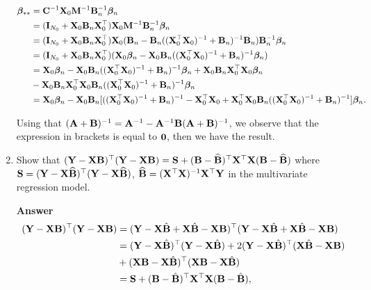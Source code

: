 \begin{enumerate}[leftmargin=*]
\begin{align*}
	\bm{\beta}_{**}&={\bf{C}}^{-1}{\bf{X}}_0{\bf{M}}^{-1}{\bf{B}}_n^{-1}\bm{\beta}_n\\
	&=({\bf{I}}_{N_0}+{\bf{X}}_0{\bf{B}}_n{\bf{X}}_0^{\top}){\bf{X}}_0{\bf{M}}^{-1}{\bf{B}}_n^{-1}\bm{\beta}_n\\
	&=({\bf{I}}_{N_0}+{\bf{X}}_0{\bf{B}}_n{\bf{X}}_0^{\top}){\bf{X}}_0({\bf{B}}_n-{\bf{B}}_n(({\bf{X}}_0^{\top}{\bf{X}}_0)^{-1}+{\bf{B}}_n)^{-1}{\bf{B}}_n){\bf{B}}_n^{-1}\bm{\beta}_n\\
	&=({\bf{I}}_{N_0}+{\bf{X}}_0{\bf{B}}_n{\bf{X}}_0^{\top})({\bf{X}}_0\bm{\beta}_n-{\bf{X}}_0{\bf{B}}_n(({\bf{X}}_0^{\top}{\bf{X}}_0)^{-1}+{\bf{B}}_n)^{-1}\bm{\beta}_n)\\
	&={\bf{X}}_0\bm{\beta}_n-{\bf{X}}_0{\bf{B}}_n(({\bf{X}}_0^{\top}{\bf{X}}_0)^{-1}+{\bf{B}}_n)^{-1}\bm{\beta}_n+{\bf{X}}_0{\bf{B}}_n{\bf{X}}_0^{\top}{\bf{X}}_0\bm{\beta}_n\\
	&-{\bf{X}}_0{\bf{B}}_n{\bf{X}}_0^{\top}{\bf{X}}_0{\bf{B}}_n(({\bf{X}}_0^{\top}{\bf{X}}_0)^{-1}+{\bf{B}}_n)^{-1}\bm{\beta}_n\\
	&={\bf{X}}_0\bm{\beta}_n-{\bf{X}}_0{\bf{B}}_n[(({\bf{X}}_0^{\top}{\bf{X}}_0)^{-1}+{\bf{B}}_n)^{-1}-{\bf{X}}_0^{\top}{\bf{X}}_0+{\bf{X}}_0^{\top}{\bf{X}}_0{\bf{B}}_n(({\bf{X}}_0^{\top}{\bf{X}}_0)^{-1}+{\bf{B}}_n)^{-1}]\bm{\beta}_n.
\end{align*}

Using that $({\bf{A}}+{\bf{B}})^{-1}={\bf{A}}^{-1}-{\bf{A}}^{-1}{\bf{B}}({\bf{A}}+{\bf{B}})^{-1}$, we observe that the expression in brackets is equal to ${\bf{0}}$, then we have the result.

\item Show that $({\bf{Y}}-{\bf{X}}{\bf{B}})^{\top}({\bf{Y}}-{\bf{X}}{\bf{B}})={\bf{S}}+({\bf{B}}-\widehat{\bf{B}})^{\top}{\bf{X}}^{\top}{\bf{X}}({\bf{B}}-\widehat{\bf{B}})$ where ${\bf{S}}= ({\bf{Y}}-{\bf{X}}\widehat{\bf{B}})^{\top}({\bf{Y}}-{\bf{X}}\widehat{\bf{B}})$, $\widehat{\bf{B}}= ({\bf{X}}^{\top}{\bf{X}})^{-1}{\bf{X}}^{\top}{\bf{Y}}$ in the multivariate regression model.

\textbf{Answer}
\begin{align*}
	({\bf{Y}}-{\bf{X}}{\bf{B}})^{\top}({\bf{Y}}-{\bf{X}}{\bf{B}})&=({\bf{Y}}-{\bf{X}}\hat{{\bf{B}}}+{\bf{X}}\hat{{\bf{B}}}-{\bf{X}}{\bf{B}})^{\top}({\bf{Y}}-{\bf{X}}\hat{{\bf{B}}}+{\bf{X}}\hat{{\bf{B}}}-{\bf{X}}{\bf{B}})\\
	&=({\bf{Y}}-{\bf{X}}\hat{{\bf{B}}})^{\top}({\bf{Y}}-{\bf{X}}\hat{{\bf{B}}})+2({\bf{Y}}-{\bf{X}}\hat{{\bf{B}}})^{\top}({\bf{X}}\hat{{\bf{B}}}-{\bf{X}}{\bf{B}})\\
	&+({\bf{X}}{\bf{B}}-{\bf{X}}\hat{{\bf{B}}})^{\top}({\bf{X}}{\bf{B}}-{\bf{X}}\hat{{\bf{B}}})\\
	&={\bf{S}}+({\bf{B}}-\hat{{\bf{B}}})^{\top}{\bf{X}}^{\top}{\bf{X}}({\bf{B}}-\hat{{\bf{B}}}),
\end{align*}


\end{enumerate}

